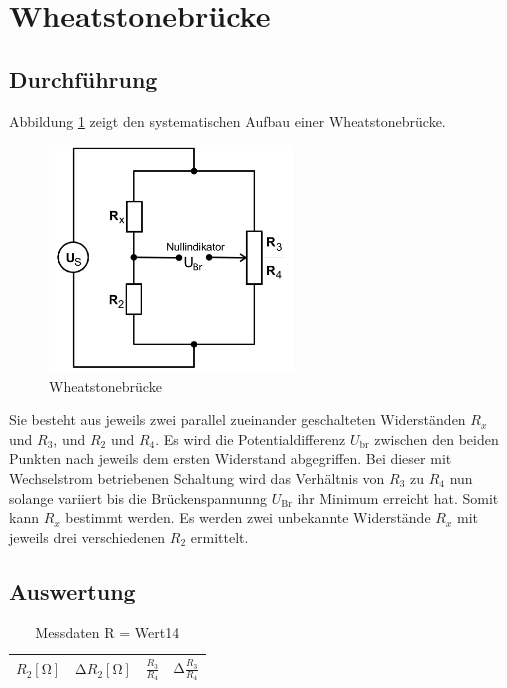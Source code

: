 \section{Wheatstonebrücke}
\subsection{Durchführung}
Abbildung \ref{fig:1} zeigt den systematischen Aufbau einer Wheatstonebrücke.
\begin{figure}[H]
  \centering
  \includegraphics[height=6cm]{wheat.png}
  \caption{Wheatstonebrücke \cite{sample}}
  \label{fig:1}
\end{figure}
Sie besteht aus jeweils zwei parallel zueinander geschalteten Widerständen $R_x$ und $R_3$, und $R_2$ und $R_4$.
Es wird die Potentialdifferenz $U_{\text{br}}$ zwischen den beiden Punkten nach jeweils dem ersten Widerstand abgegriffen.
Bei dieser mit Wechselstrom betriebenen Schaltung wird das Verhältnis von $R_3$ zu $R_4$ nun solange variiert bis die Brückenspannunng $U_{\text{Br}}$ ihr Minimum erreicht hat.
Somit kann $R_x$ bestimmt werden.
Es werden zwei unbekannte Widerstände $R_x$ mit jeweils drei verschiedenen $R_2$ ermittelt.
\subsection{Auswertung}
\begin{table}
  \centering
  \caption{Messdaten R = Wert14}
  \label{tab:1}
  \begin{tabular}{c c c c}
    \toprule
    {$R_2 [\si{\ohm}]$} & {$\increment R_2 [\si{\ohm}]$} & {$\frac{R_3}{R_4}$} & {$\increment \frac{R_3}{R_4}$} \\
    \midrule
    
    \bottomrule
  \end{tabular}
\end{table}


